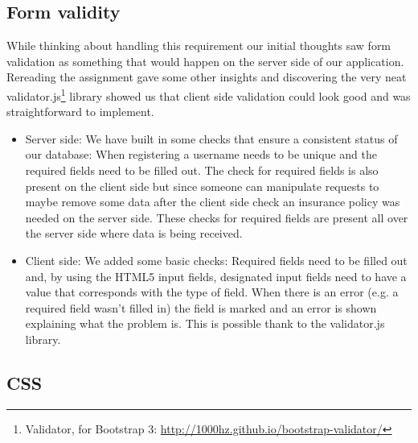 \documentclass{article}
\begin{document}
\subsection{Form validity}
While thinking about handling this requirement our initial thoughts saw form validation as something that would happen on the server side of our application. Rereading the assignment gave some other insights and discovering the very neat validator.js\footnote{Validator, for Bootstrap 3: \url{http://1000hz.github.io/bootstrap-validator/} } library showed us that client side validation could look good and was straightforward to implement.
\begin{itemize}
	\item Server side: We have built in some checks that ensure a consistent status of our database: When registering a username needs to be unique and the required fields need to be filled out. The check for required fields is also present on the client side but since someone can manipulate requests to maybe remove some data after the client side check an insurance policy was needed on the server side. These checks for required fields are present all over the server side where data is being received.
	\item Client side: We added some basic checks: Required fields need to be filled out and, by using the HTML5 input fields, designated input fields need to have a value that corresponds with the type of field. When there is an error (e.g. a required field wasn't filled in) the field is marked and an error is shown explaining what the problem is. This is possible thank to the validator.js library.
\end{itemize}

\subsection{CSS}
\end{document}
